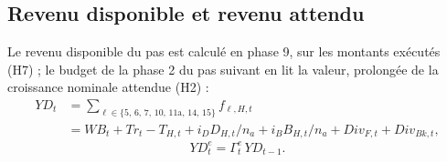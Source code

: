 \documentclass[11pt,a4paper]{article}
\begin{document}
\subsection{Revenu disponible et revenu attendu}
\label{sec:menages-revenu}
\begin{proposee}
Le revenu disponible du pas est calculé en phase 9, sur les montants exécutés (H7) ; le budget de la phase 2 du pas suivant en lit la valeur, prolongée de la croissance nominale attendue (H2) :
\begin{equation*}
\begin{split}
\mathit{YD}_t &= \sum_{\ell \in \{5,\,6,\,7,\,10,\,\text{11a},\,14,\,15\}} f_{\ell,H,t} \\
&= \mathit{WB}_t + \mathit{Tr}_t - T_{H,t} + i_D D_{H,t}/n_a + i_B B_{H,t}/n_a + \mathit{Div}_{F,t} + \mathit{Div}_{\mathit{Bk},t},
\end{split} \tag{H7}
\end{equation*}
\begin{equation*}
\mathit{YD}^e_t = \Gamma^e_t\, \mathit{YD}_{t-1} . \tag{H2}
\end{equation*}


\end{proposee}
\end{document}
